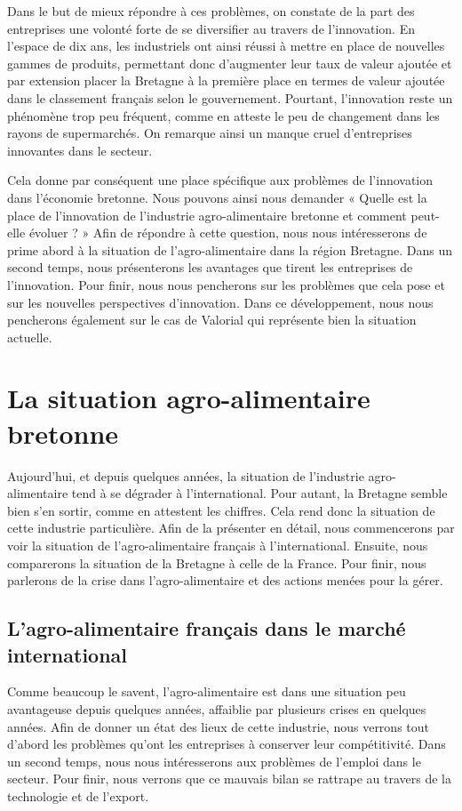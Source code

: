 \documentclass[a4paper,12pt]{report}
\begin{document}
	 Dans le but de mieux répondre à ces problèmes, on constate de la part des entreprises une volonté forte de se diversifier au travers de l’innovation. En l’espace de dix ans, les industriels ont ainsi réussi à mettre en place de nouvelles gammes de produits, permettant donc d’augmenter leur taux de valeur ajoutée et par extension placer la Bretagne à la première place en termes de valeur ajoutée dans le classement français selon le gouvernement. Pourtant, l'innovation reste un phénomène trop peu fréquent, comme en atteste le peu de changement dans les rayons de supermarchés. On remarque ainsi un manque cruel d'entreprises innovantes dans le secteur.
	 
	 Cela donne par conséquent une place spécifique aux problèmes de l'innovation dans l’économie bretonne. Nous pouvons ainsi nous demander « Quelle est la place de l'innovation de l'industrie agro-alimentaire bretonne et comment peut-elle évoluer ? » Afin de répondre à cette question, nous nous intéresserons de prime abord à la situation de l’agro-alimentaire dans la région Bretagne. Dans un second temps, nous présenterons les avantages que tirent les entreprises de l'innovation. Pour finir, nous nous pencherons sur les problèmes que cela pose et sur les nouvelles perspectives d'innovation. Dans ce développement, nous nous pencherons également sur le cas de Valorial qui représente bien la situation actuelle.
	 
\chapter{La situation agro-alimentaire bretonne}
	Aujourd’hui, et depuis quelques années, la situation de l’industrie agro-alimentaire tend à se dégrader à l’international. Pour autant, la Bretagne semble bien s’en sortir, comme en attestent les chiffres. Cela rend donc la situation de cette industrie particulière. Afin de la présenter en détail, nous commencerons par voir la situation de l’agro-alimentaire français à l’international. Ensuite, nous comparerons la situation de la Bretagne à celle de la France. Pour finir, nous parlerons de la crise dans l’agro-alimentaire et des actions menées pour la gérer.

	\section{L’agro-alimentaire français dans le marché international}
		Comme beaucoup le savent, l’agro-alimentaire est dans une situation peu avantageuse depuis quelques années, affaiblie par plusieurs crises en quelques années. Afin de donner un état des lieux de cette industrie, nous verrons tout d’abord les problèmes qu’ont les entreprises à conserver leur compétitivité. Dans un second temps, nous nous intéresserons aux problèmes de l’emploi dans le secteur. Pour finir, nous verrons que ce mauvais bilan se rattrape au travers de la technologie et de l’export.
\end{document}
